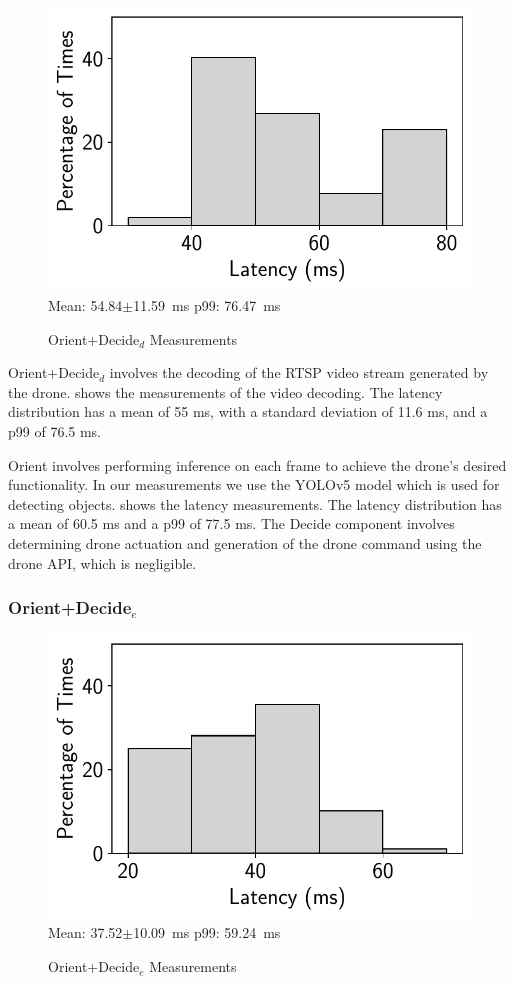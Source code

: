 \begin{figure}[htbp]
    \centering
    \includegraphics[width = .4\textwidth]{figs/voxl-decoding-time.pdf}\\
\small{Mean: 54.84$\pm$11.59~ms\; p99: 76.47~ms}\\
\caption{Orient+Decide$_d$ Measurements}
\label{fig:voxl2-decoding-latency}
\end{figure}

Orient+Decide$_d$ involves the decoding of the RTSP video stream generated
by the drone.  shows the measurements of
the video decoding. The latency distribution has a mean of 55 ms, with a
standard deviation of 11.6 ms, and a p99 of 76.5 ms.

Orient involves performing inference on each frame to achieve the drone's
desired functionality. In our measurements we use the YOLOv5 model which is
used for detecting objects.  shows the latency
measurements.  The latency distribution has a mean of 60.5 ms and a p99 of 77.5
ms. The Decide component involves determining drone actuation and generation of
the drone command using the drone API, which is negligible.

\subsubsection*{Orient+Decide$_{e}$}

\begin{figure}[htbp]
    \centering
    \includegraphics[width = .4\textwidth]{figs/voxl-5g-latency.pdf}\\
\small{Mean: 37.52$\pm$10.09~ms\; p99: 59.24~ms}\\
\caption{Orient+Decide$_e$ Measurements}
\label{fig:voxl2-5g-latency}
\end{figure}

